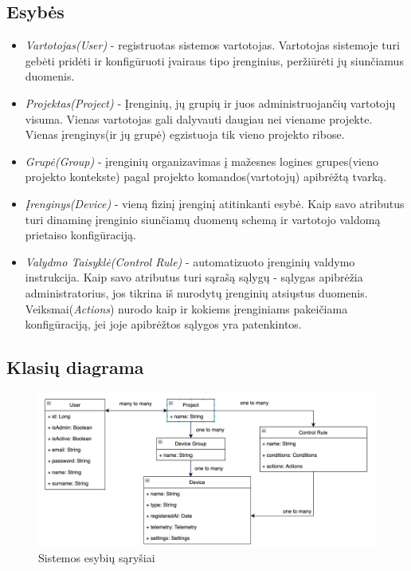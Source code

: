 \documentclass{VUMIFInfBakalaurinis}
\begin{document}
\subsection{Esybės}
\begin{itemize}
\item \emph{Vartotojas(User)} - registruotas sistemos vartotojas. Vartotojas sistemoje turi gebėti pridėti ir konfigūruoti įvairaus tipo įrenginius, peržiūrėti jų siunčiamus duomenis.
\item \emph{Projektas(Project)} - Įrenginių, jų grupių ir juos administruojančių vartotojų visuma. Vienas vartotojas gali dalyvauti daugiau nei viename projekte. Vienas įrenginys(ir jų grupė) egzistuoja tik vieno projekto ribose.
\item \emph{Grupė(Group)} - įrenginių organizavimas į mažesnes logines grupes(vieno projekto kontekste) pagal projekto komandos(vartotojų) apibrėžtą tvarką.
\item \emph{Įrenginys(Device)} - vieną fizinį įrenginį atitinkanti esybė.
Kaip savo atributus turi dinaminę įrenginio siunčiamų duomenų schemą ir vartotojo valdomą prietaiso konfigūraciją.
\item \emph{Valydmo Taisyklė(Control Rule)} - automatizuoto įrenginių valdymo instrukcija.
Kaip savo atributus turi sąrašą sąlygų - sąlygas apibrėžia administratorius, jos tikrina iš nurodytų įrenginių atsiųstus duomenis. Veiksmai(\emph{Actions}) nurodo kaip ir kokiems įrenginiams pakeičiama konfigūraciją, jei joje apibrėžtos sąlygos yra patenkintos.
\end{itemize}

\subsection{Klasių diagrama}
\begin{figure}[H]
    \centering
    \includegraphics[scale=0.5]{img/class-diagram-iot-v1}
    \caption{Sistemos esybių sąryšiai}
    \label{img:mlp}
\end{figure}
\end{document}
